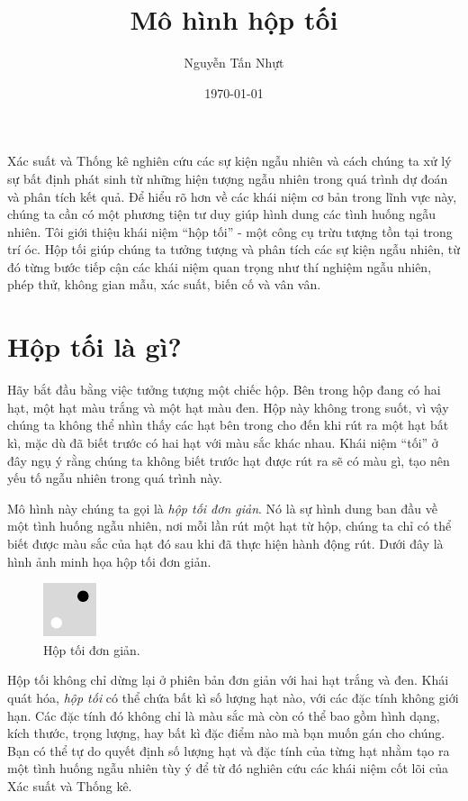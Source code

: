 \documentclass[12pt]{article} %
\title{Mô hình hộp tối}
\author{Nguyễn Tấn Nhựt}
\date{\today}
\begin{document}
\maketitle
Xác suất và Thống kê nghiên cứu các sự kiện ngẫu nhiên và cách chúng ta xử lý sự bất định phát sinh từ những hiện tượng ngẫu nhiên trong quá trình dự đoán và phân tích kết quả. Để hiểu rõ hơn về các khái niệm cơ bản trong lĩnh vực này, chúng ta cần có một phương tiện tư duy giúp hình dung các tình huống ngẫu nhiên. Tôi giới thiệu khái niệm ``hộp tối'' - một công cụ trừu tượng tồn tại trong trí óc. Hộp tối giúp chúng ta tưởng tượng và phân tích các sự kiện ngẫu nhiên, từ đó từng bước tiếp cận các khái niệm quan trọng như thí nghiệm ngẫu nhiên, phép thử, không gian mẫu, xác suất, biến cố và vân vân.

\section*{Hộp tối là gì?}
Hãy bắt đầu bằng việc tưởng tượng một chiếc hộp. Bên trong hộp đang có hai hạt, một hạt màu trắng và một hạt màu đen. Hộp này không trong suốt, vì vậy chúng ta không thể nhìn thấy các hạt bên trong cho đến khi rút ra một hạt bất kì, mặc dù đã biết trước có hai hạt với màu sắc khác nhau. Khái niệm ``tối'' ở đây ngụ ý rằng chúng ta không biết trước hạt được rút ra sẽ có màu gì, tạo nên yếu tố ngẫu nhiên trong quá trình này. 

Mô hình này chúng ta gọi là \emph{hộp tối đơn giản}. Nó là sự hình dung ban đầu về một tình huống ngẫu nhiên, nơi mỗi lần rút một hạt từ hộp, chúng ta chỉ có thể biết được màu sắc của hạt đó sau khi đã thực hiện hành động rút. Dưới đây là hình ảnh minh họa hộp tối đơn giản.

\begin{figure}[h!]
    \centering
    \includegraphics{tex-images/hop_toi_2_hat_1_trang_va_1_den/hop_toi_2_hat_1_trang_va_1_den.pdf}
    \caption{Hộp tối đơn giản.}
    \label{fig:hop_toi_1_trang_va_1_den}
\end{figure}

Hộp tối không chỉ dừng lại ở phiên bản đơn giản với hai hạt trắng và đen. Khái quát hóa, \emph{hộp tối} có thể chứa bất kì số lượng hạt nào, với các đặc tính không giới hạn. Các đặc tính đó không chỉ là màu sắc mà còn có thể bao gồm hình dạng, kích thước, trọng lượng, hay bất kì đặc điểm nào mà bạn muốn gán cho chúng. Bạn có thể tự do quyết định số lượng hạt và đặc tính của từng hạt nhằm tạo ra một tình huống ngẫu nhiên tùy ý để từ đó nghiên cứu các khái niệm cốt lõi của Xác suất và Thống kê.
\end{document}
